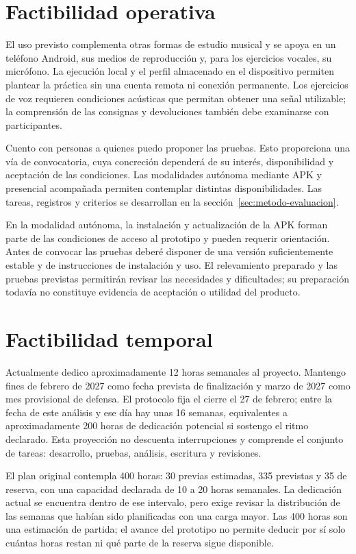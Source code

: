 \section{Factibilidad operativa}
El uso previsto complementa otras formas de estudio musical y se apoya en un
teléfono Android, sus medios de reproducción y, para los ejercicios vocales,
su micrófono. La ejecución local y el perfil almacenado en el dispositivo
permiten plantear la práctica sin una cuenta remota ni conexión permanente.
Los ejercicios de voz requieren condiciones acústicas que permitan obtener
una señal utilizable; la comprensión de las consignas y devoluciones también
debe examinarse con participantes.

Cuento con personas a quienes puedo proponer las pruebas. Esto proporciona una
vía de convocatoria, cuya concreción dependerá de su interés, disponibilidad y
aceptación de las condiciones. Las modalidades autónoma mediante APK y presencial
acompañada permiten contemplar distintas disponibilidades. Las tareas, registros
y criterios se desarrollan en la sección~\ref{sec:metodo-evaluacion}.

En la modalidad autónoma, la instalación y actualización de la APK forman parte
de las condiciones de acceso al prototipo y pueden requerir orientación.
Antes de convocar las pruebas deberé disponer de una versión suficientemente
estable y de instrucciones de instalación y uso. El relevamiento preparado y
las pruebas previstas permitirán revisar las necesidades y dificultades; su
preparación todavía no constituye evidencia de aceptación o utilidad del producto.

\section{Factibilidad temporal}
Actualmente dedico aproximadamente 12 horas semanales al proyecto. Mantengo
fines de febrero de 2027 como fecha prevista de finalización y marzo de 2027
como mes provisional de defensa. El protocolo fija el cierre el 27 de febrero;
entre la fecha de este análisis y ese día hay unas 16 semanas, equivalentes a
aproximadamente 200 horas de dedicación potencial si sostengo el ritmo declarado.
Esta proyección no descuenta interrupciones y comprende el conjunto de tareas:
desarrollo, pruebas, análisis, escritura y revisiones.

El plan original contempla 400 horas: 30 previas estimadas, 335 previstas y
35 de reserva, con una capacidad declarada de 10 a 20 horas semanales. La
dedicación actual se encuentra dentro de ese intervalo, pero exige revisar
la distribución de las semanas que habían sido planificadas con una carga mayor.
Las 400 horas son una estimación de partida; el avance del prototipo no permite
deducir por sí solo cuántas horas restan ni qué parte de la reserva sigue disponible.

